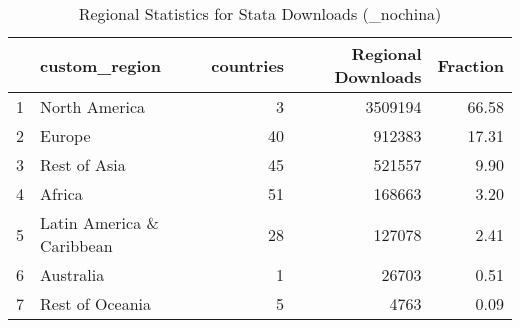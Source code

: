 \begin{table}[ht]
\centering
\begin{tabular}{rlrrr}
  \hline
 & custom\_region & countries & Regional Downloads & Fraction \\ 
  \hline
1 & North America &   3 & 3509194 & 66.58 \\ 
  2 & Europe &  40 & 912383 & 17.31 \\ 
  3 & Rest of Asia &  45 & 521557 & 9.90 \\ 
  4 & Africa &  51 & 168663 & 3.20 \\ 
  5 & Latin America \& Caribbean &  28 & 127078 & 2.41 \\ 
  6 & Australia &   1 & 26703 & 0.51 \\ 
  7 & Rest of Oceania &   5 & 4763 & 0.09 \\ 
   \hline
\end{tabular}
\caption{Regional Statistics for Stata Downloads (_nochina)} 
\label{tab:stata_downloads_regional_stats_select_nochina}
\end{table}
